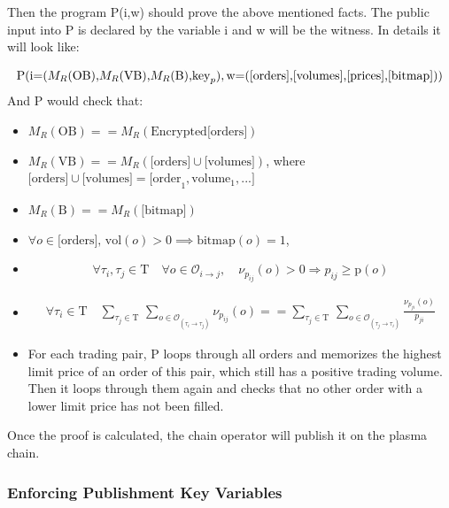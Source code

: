 \documentclass[11pt,parskip=full]{scrartcl}%
\newcommand{\Tau}{\mathrm{T}}
\def\pO{\mathcal{O}}
\def\ra{\rightarrow}
\begin{document}
Then the program P(i,w) should prove the above mentioned facts. 
The public input into P is declared by the variable i and w will be the witness. 
In details it will look like:

\begin{equation}
\text{P(i=(}M_R\text{(OB),}M_R\text{(VB),}M_R\text{(B),} \text{key}_p),\\
\text{w=([orders],[volumes],[prices],[bitmap]))} 
\end{equation}
And P would check that:
\begin{itemize}
\item  $M_R(\text{OB}) == M_R(\text{Encrypted[orders]})$
\item  $M_R(\text{VB}) == M_R(\text{[orders]} \cup \text{[volumes]})$,\newline
where $\text{[orders]} \cup \text{[volumes]} = \text{[order}_1, \text{volume}_1, ...] $
\item $ M_R(\text{B}) == M_R(\text{[bitmap]})$
\item $\forall o \in \text{[orders], vol}(o)>0 \implies \text{bitmap}(o) = 1 $, 

\item 
\begin{equation}  \forall \tau_i ,\tau_j \in \Tau \quad \forall o \in \pO_{i\ra j}, \quad \nu_{p_{ij}}(o)>0 \Rightarrow p_{ij}\geq \text{p}(o)
\end{equation}
\item 
\begin{equation}
\begin{split}
\forall \tau_i \in \Tau \quad \sum_{\tau_j\in \Tau} \,
\sum_{ o\in \pO_{(\tau_i \rightarrow \tau_j)}} \nu_{p_{ij}}(o) == \sum_{\tau_j\in \Tau} \, \sum_{o\in \pO_{(\tau_j\rightarrow \tau_i)}} \frac{\nu_{p_{ji}}(o)}{p_{ji}}
\end{split}
\end{equation}
\item For each trading pair, P loops through all orders and memorizes the highest limit price of an order of this pair, which still has a positive trading volume. 
Then it loops through them again and checks that no other order with a lower limit price has not been filled. 
\end{itemize}

Once the proof is calculated, the chain operator will publish it on the plasma chain. 


\subsubsection{Enforcing Publishment Key Variables}
\end{document}
